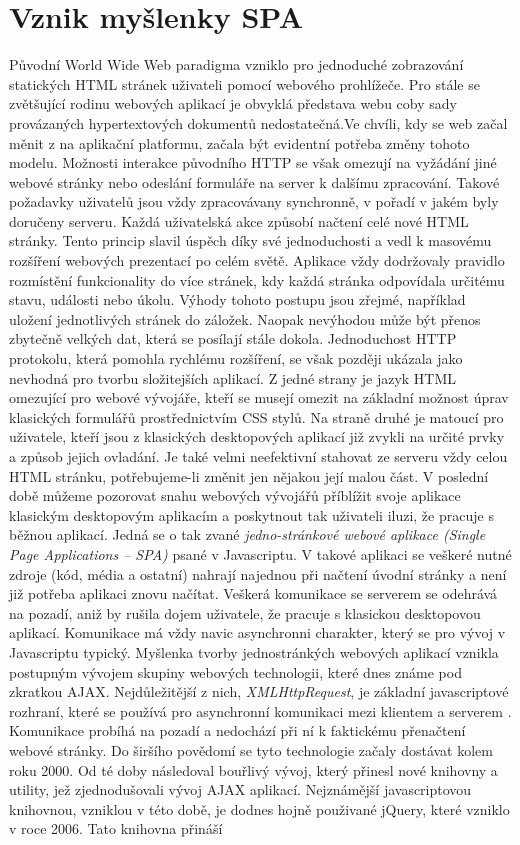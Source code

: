 \section{Vznik myšlenky SPA}
Původní World Wide Web paradigma vzniklo pro jednoduché zobrazování statických HTML stránek uživateli pomocí webového prohlížeče. Pro stále se zvětšující rodinu webových aplikací je obvyklá představa webu coby sady provázaných hypertextových dokumentů nedostatečná.Ve chvíli, kdy se web začal měnit z  na aplikační platformu, začala být evidentní potřeba změny tohoto modelu. Možnosti interakce původního HTTP se však omezují na vyžádání jiné webové stránky nebo odeslání formuláře na server k dalšímu zpracování. Takové požadavky uživatelů jsou vždy zpracovávany synchronně, v pořadí v jakém byly doručeny serveru. Každá uživatelská akce způsobí načtení celé nové HTML stránky. Tento princip slavil úspěch díky své jednoduchosti a vedl k masovému rozšíření webových prezentací po celém světě. Aplikace vždy dodržovaly pravidlo rozmístění funkcionality do více stránek, kdy každá stránka odpovídala určitému stavu, události nebo úkolu. Výhody tohoto postupu jsou zřejmé, například uložení jednotlivých stránek do záložek. Naopak nevýhodou může být přenos zbytečně velkých dat, která se posílají stále dokola. Jednoduchost HTTP protokolu, která pomohla rychlému rozšíření, se však později ukázala jako nevhodná pro tvorbu složitejších aplikací. Z jedné strany je jazyk HTML omezující pro webové vývojáře, kteří se musejí omezit na základní možnost úprav klasických formulářů prostřednictvím CSS stylů. Na straně druhé je matoucí pro uživatele, kteří jsou z klasických desktopových aplikací již zvykli na určité prvky a způsob jejich ovladání. Je také velmi neefektivní stahovat ze serveru vždy celou HTML stránku, potřebujeme-li změnit jen nějakou její malou část. V poslední době můžeme pozorovat snahu webových vývojářů příblížit svoje aplikace klasickým desktopovým aplikacím a poskytnout tak uživateli iluzi, že pracuje s běžnou aplikací. Jedná se o tak zvané \textit{jedno-stránkové webové aplikace (Single Page Applications – SPA)} \cite{spa} psané v Javascriptu. V takové aplikaci se veškeré nutné zdroje (kód, média a ostatní) nahrají najednou při načtení úvodní stránky a není již potřeba aplikaci znovu načítat. Veškerá komunikace se serverem se odehrává na pozadí, aniž by rušila dojem uživatele, že pracuje s klasickou desktopovou aplikací. Komunikace má vždy navic asynchronni charakter, který se pro vývoj v Javascriptu typický. Myšlenka tvorby jednostránkých webových aplikací vznikla postupným vývojem skupiny webových technologii, které dnes známe pod zkratkou AJAX. Nejdůležitější z nich, \textit{XMLHttpRequest}, je základní javascriptové rozhraní, které se používá pro asynchronní komunikaci mezi klientem a serverem \cite{xhr}. Komunikace probíhá na pozadí a nedochází při ní k faktickému přenačtení webové stránky. Do širšího povědomí se tyto technologie začaly dostávat kolem roku 2000. Od té doby následoval bouřlivý vývoj, který přinesl nové knihovny a utility, jež zjednodušovali vývoj AJAX aplikací. Nejznámější javascriptovou knihovnou, vzniklou v této době, je dodnes hojně použivané jQuery, které vzniklo v roce 2006. Tato knihovna přináší 